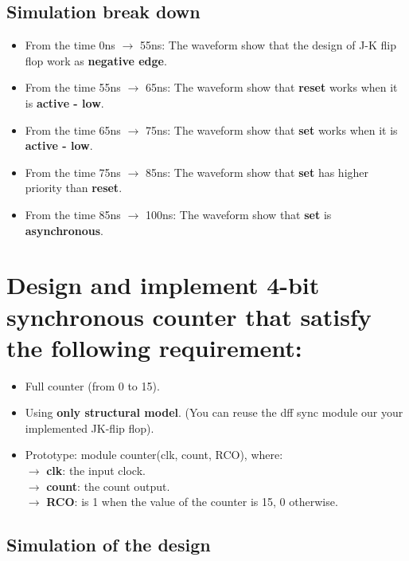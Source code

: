 \documentclass [12pt] {article}
\begin{document}
		\subsection {Simulation break down}
			\begin {itemize}
				\item From the time 0ns $\rightarrow$ 55ns: The waveform show that the design of J-K flip flop work as \textbf{negative edge}.
				\item From the time 55ns $\rightarrow$ 65ns: The waveform show that \textbf{reset} works when it is \textbf{active - low}.
				\item From the time 65ns $\rightarrow$ 75ns: The waveform show that \textbf{set} works when it is \textbf{active - low}.
				\item From the time 75ns $\rightarrow$ 85ns: The waveform show that \textbf{set} has higher priority than \textbf{reset}.
				\item From the time 85ns $\rightarrow$ 100ns: The waveform show that \textbf{set} is \textbf{asynchronous}.
			\end {itemize}
			
	\section{Design and implement 4-bit synchronous counter that satisfy the following requirement:}
		\begin {itemize}
			\item Full counter (from 0 to 15). 
			\item Using \textbf{only structural model}. (You can reuse the dff sync module our your implemented JK-flip flop).
			\item Prototype: module counter(clk, count, RCO), where: \\
				$\rightarrow$ \textbf{clk}: the input clock.\\
				$\rightarrow$ \textbf{count}: the count output.\\
				$\rightarrow$ \textbf{RCO}: is 1 when the value of the counter is 15, 0 otherwise.\\
		\end{itemize}
		
		\subsection {Simulation of the design}		
		
\end{document}
